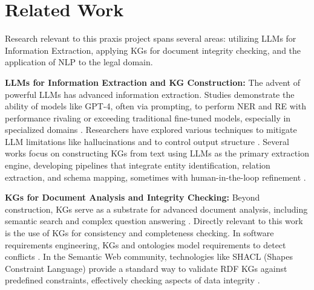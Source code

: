 \section{Related Work} %
Research relevant to this praxis project spans several areas: utilizing LLMs for Information Extraction, applying KGs for document integrity checking, and the application of NLP to the legal domain.

\textbf{LLMs for Information Extraction and KG Construction:}
The advent of powerful LLMs has advanced information extraction. Studies demonstrate the ability of models like GPT-4, often via prompting, to perform NER and RE with performance rivaling or exceeding traditional fine-tuned models, especially in specialized domains \parencite{RefWorks:RefID:160-xu2024large}. Researchers have explored various techniques to mitigate LLM limitations like hallucinations and to control output structure \parencite{RefWorks:RefID:87-wang2023gptner}. Several works focus on constructing KGs from text using LLMs as the primary extraction engine, developing pipelines that integrate entity identification, relation extraction, and schema mapping, sometimes with human-in-the-loop refinement \parencite{RefWorks:RefID:107-benjira2025automated, RefWorks:RefID:162-lairgi2024knowledge}.

\textbf{KGs for Document Analysis and Integrity Checking:}
Beyond construction, KGs serve as a substrate for advanced document analysis, including semantic search and complex question answering \parencite{RefWorks:RefID:102-hogan2021knowledge, RefWorks:RefID:118-ji2022survey}. Directly relevant to this work is the use of KGs for consistency and completeness checking. In software requirements engineering, KGs and ontologies model requirements to detect conflicts \parencite{RefWorks:RefID:29-umar2024advances}. In the Semantic Web community, technologies like SHACL (Shapes Constraint Language) provide a standard way to validate RDF KGs against predefined constraints, effectively checking aspects of data integrity \parencite{RefWorks:RefID:154-knublauch2017shapes}.

